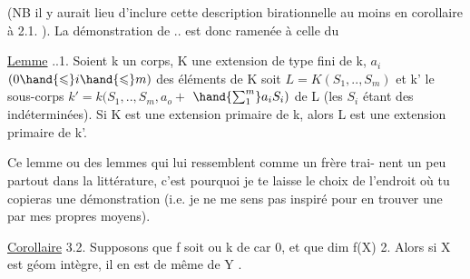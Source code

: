 
(NB il y aurait lieu d'inclure cette description birationnelle au moins
en corollaire à 2.1. ). La démonstration de .. est donc ramenée à
celle du

\uline{Lemme} ..1.  Soient k un corps, K une extension de type fini de k, 
$a_i$ $(0\hand{\leqslant} i\hand{\leqslant} m)$ des éléments de K  
 soit $L = K(S_1,..,S_m)$ et k' le sous-corps $k'= k(S_1,..,S_m,a_o +$
$\hand{\sum_{1}^{m}}a_iS_i)$ de L (les $S_i$ étant des indéterminées). \hand{,} Si K est une
extension primaire de k, alors L est une extension primaire de k'.

 Ce lemme\hand{,} ou des lemmes qui lui ressemblent comme un frère\hand{,} trai-%
nent un peu partout dans la littérature, c'est pourquoi je te laisse le
choix de l'endroit où tu copieras une démonstration (i.e. je ne me sens
pas inspiré pour en trouver une par mes propres moyens).

\uline{Corollaire} 3.2. Supposons que f soit   ou k de car 0,
et que dim f(X) 2. Alors si X est géom intègre, il en est de même de
Y\hand{$_\eta$} .

